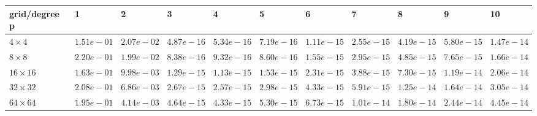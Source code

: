 \begin{tabular}{lllllllllll}
\hline
 grid/degree p   & 1          & 2          & 3          & 4          & 5          & 6          & 7          & 8          & 9          & 10         \\
\hline
 $4 \times 4$    & $1.51e-01$ & $2.07e-02$ & $4.87e-16$ & $5.34e-16$ & $7.19e-16$ & $1.11e-15$ & $2.55e-15$ & $4.19e-15$ & $5.80e-15$ & $1.47e-14$ \\
 $8 \times 8$    & $2.20e-01$ & $1.99e-02$ & $8.38e-16$ & $9.32e-16$ & $8.60e-16$ & $1.55e-15$ & $2.95e-15$ & $4.85e-15$ & $7.65e-15$ & $1.66e-14$ \\
 $16 \times 16$  & $1.63e-01$ & $9.98e-03$ & $1.29e-15$ & $1.13e-15$ & $1.53e-15$ & $2.31e-15$ & $3.88e-15$ & $7.30e-15$ & $1.19e-14$ & $2.06e-14$ \\
 $32 \times 32$  & $2.08e-01$ & $6.86e-03$ & $2.67e-15$ & $2.57e-15$ & $2.98e-15$ & $4.33e-15$ & $5.91e-15$ & $1.25e-14$ & $1.64e-14$ & $3.05e-14$ \\
 $64 \times 64$  & $1.95e-01$ & $4.14e-03$ & $4.64e-15$ & $4.33e-15$ & $5.30e-15$ & $6.73e-15$ & $1.01e-14$ & $1.80e-14$ & $2.44e-14$ & $4.45e-14$ \\
\hline
\end{tabular}